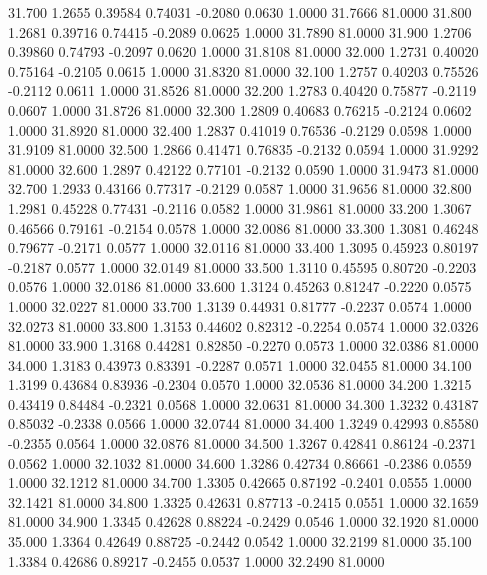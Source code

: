   31.700   1.2655   0.39584   0.74031  -0.2080   0.0630   1.0000  31.7666  81.0000
  31.800   1.2681   0.39716   0.74415  -0.2089   0.0625   1.0000  31.7890  81.0000
  31.900   1.2706   0.39860   0.74793  -0.2097   0.0620   1.0000  31.8108  81.0000
  32.000   1.2731   0.40020   0.75164  -0.2105   0.0615   1.0000  31.8320  81.0000
  32.100   1.2757   0.40203   0.75526  -0.2112   0.0611   1.0000  31.8526  81.0000
  32.200   1.2783   0.40420   0.75877  -0.2119   0.0607   1.0000  31.8726  81.0000
  32.300   1.2809   0.40683   0.76215  -0.2124   0.0602   1.0000  31.8920  81.0000
  32.400   1.2837   0.41019   0.76536  -0.2129   0.0598   1.0000  31.9109  81.0000
  32.500   1.2866   0.41471   0.76835  -0.2132   0.0594   1.0000  31.9292  81.0000
  32.600   1.2897   0.42122   0.77101  -0.2132   0.0590   1.0000  31.9473  81.0000
  32.700   1.2933   0.43166   0.77317  -0.2129   0.0587   1.0000  31.9656  81.0000
  32.800   1.2981   0.45228   0.77431  -0.2116   0.0582   1.0000  31.9861  81.0000
  33.200   1.3067   0.46566   0.79161  -0.2154   0.0578   1.0000  32.0086  81.0000
  33.300   1.3081   0.46248   0.79677  -0.2171   0.0577   1.0000  32.0116  81.0000
  33.400   1.3095   0.45923   0.80197  -0.2187   0.0577   1.0000  32.0149  81.0000
  33.500   1.3110   0.45595   0.80720  -0.2203   0.0576   1.0000  32.0186  81.0000
  33.600   1.3124   0.45263   0.81247  -0.2220   0.0575   1.0000  32.0227  81.0000
  33.700   1.3139   0.44931   0.81777  -0.2237   0.0574   1.0000  32.0273  81.0000
  33.800   1.3153   0.44602   0.82312  -0.2254   0.0574   1.0000  32.0326  81.0000
  33.900   1.3168   0.44281   0.82850  -0.2270   0.0573   1.0000  32.0386  81.0000
  34.000   1.3183   0.43973   0.83391  -0.2287   0.0571   1.0000  32.0455  81.0000
  34.100   1.3199   0.43684   0.83936  -0.2304   0.0570   1.0000  32.0536  81.0000
  34.200   1.3215   0.43419   0.84484  -0.2321   0.0568   1.0000  32.0631  81.0000
  34.300   1.3232   0.43187   0.85032  -0.2338   0.0566   1.0000  32.0744  81.0000
  34.400   1.3249   0.42993   0.85580  -0.2355   0.0564   1.0000  32.0876  81.0000
  34.500   1.3267   0.42841   0.86124  -0.2371   0.0562   1.0000  32.1032  81.0000
  34.600   1.3286   0.42734   0.86661  -0.2386   0.0559   1.0000  32.1212  81.0000
  34.700   1.3305   0.42665   0.87192  -0.2401   0.0555   1.0000  32.1421  81.0000
  34.800   1.3325   0.42631   0.87713  -0.2415   0.0551   1.0000  32.1659  81.0000
  34.900   1.3345   0.42628   0.88224  -0.2429   0.0546   1.0000  32.1920  81.0000
  35.000   1.3364   0.42649   0.88725  -0.2442   0.0542   1.0000  32.2199  81.0000
  35.100   1.3384   0.42686   0.89217  -0.2455   0.0537   1.0000  32.2490  81.0000
